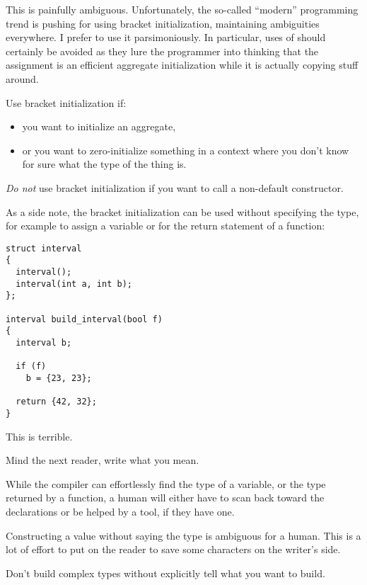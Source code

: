 This is painfully ambiguous. Unfortunately, the so-called ``modern''
\cpp{} programming trend is pushing for using bracket initialization,
maintaining ambiguities everywhere. I prefer to use it
parsimoniously. In particular, uses of 
should certainly be avoided as they lure the programmer into thinking
that the assignment is an efficient aggregate initialization while it
is actually copying stuff around.

\begin{guideline}
  Use bracket initialization if:
  \begin{itemize}
  \item you want to initialize an aggregate,
  \item or you want to zero-initialize something in a context where
    you don't know for sure what the type of the thing is.
  \end{itemize}

  \emph{Do not} use bracket initialization if you want to call a
  non-default constructor.
\end{guideline}

As a side note, the bracket initialization can be used without
specifying the type, for example to assign a variable or for the
return statement of a function:

\begin{lstlisting}
struct interval
{
  interval();
  interval(int a, int b);
};

interval build_interval(bool f)
{
  interval b;

  if (f)
    b = {23, 23};

  return {42, 32};
}
\end{lstlisting}

This is terrible.

\begin{guideline}
  Mind the next reader, write what you mean.

  While the compiler can effortlessly find the type of a variable, or
  the type returned by a function, a human will either have to scan
  back toward the declarations or be helped by a tool, if they have
  one.

  Constructing a value without saying the type is ambiguous for a
  human. This is a lot of effort to put on the reader to save some
  characters on the writer's side.

  Don't build complex types without explicitly tell what you want to
  build.
\end{guideline}
